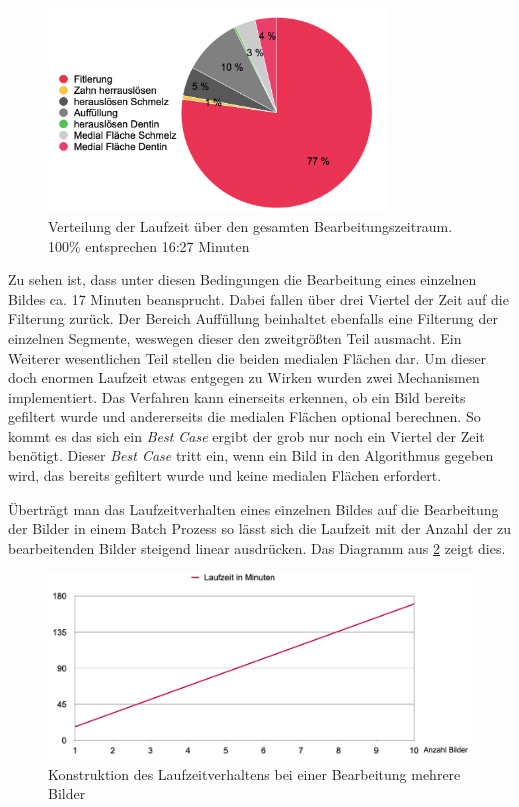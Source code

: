 \begin{figure}[h]
	\centering
	\includegraphics[width=0.8\textwidth]{img/laufzeit_diagramm.png}
	\caption{Verteilung der Laufzeit über den gesamten Bearbeitungszeitraum. 100\%
	entsprechen 16:27 Minuten}
	\label{fig:laufzeit}
\end{figure}

Zu sehen ist, dass unter diesen Bedingungen die Bearbeitung eines einzelnen Bildes
ca. 17 Minuten beansprucht. Dabei fallen über drei Viertel der Zeit auf die Filterung
zurück. Der Bereich Auffüllung beinhaltet ebenfalls eine Filterung der einzelnen
Segmente, weswegen dieser den zweitgrößten Teil ausmacht. Ein Weiterer
wesentlichen Teil stellen die beiden medialen Flächen dar. Um dieser doch enormen
Laufzeit etwas entgegen zu Wirken wurden zwei Mechanismen implementiert. Das
Verfahren kann einerseits erkennen, ob ein Bild bereits gefiltert wurde und andererseits
die medialen Flächen optional berechnen. So kommt es das sich ein \textit{Best
Case} ergibt der grob nur noch ein Viertel der Zeit benötigt. Dieser \textit{Best
Case} tritt ein, wenn ein Bild in den Algorithmus gegeben wird, das bereits gefiltert
wurde und keine medialen Flächen erfordert.

Überträgt man das Laufzeitverhalten eines einzelnen Bildes auf die Bearbeitung der
Bilder in einem Batch Prozess so lässt sich die Laufzeit mit der Anzahl der zu bearbeitenden
Bilder steigend linear ausdrücken. Das Diagramm aus \ref{fig:laufzeit_batch}
zeigt dies.

\begin{figure}[h]
	\centering
	\includegraphics[width=1\textwidth]{img/runtimeBatch.png}
	\caption{Konstruktion des Laufzeitverhaltens bei einer Bearbeitung mehrere
	Bilder}
	\label{fig:laufzeit_batch}
\end{figure}

